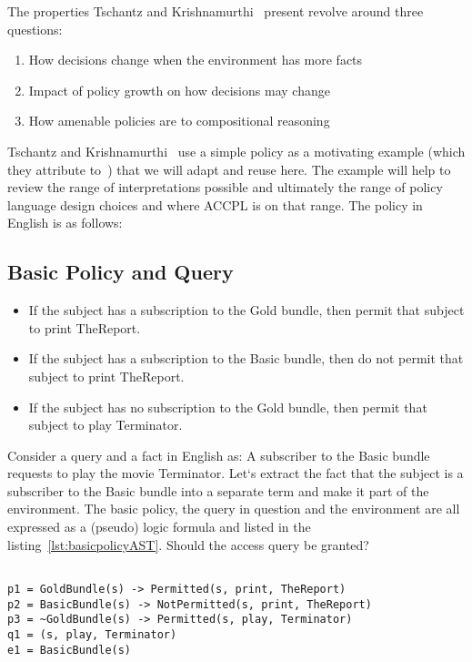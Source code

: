 The properties Tschantz and Krishnamurthi~\cite{Tschantz} present revolve around three questions:

\begin{enumerate}
\item How decisions change when the environment has more facts
\item Impact of policy growth on how decisions may change
\item How amenable policies are to compositional reasoning
\end{enumerate}

Tschantz and Krishnamurthi~\cite{Tschantz} use a simple policy as a motivating example (which they attribute to~\cite{Halpern2008}) that we will adapt and reuse here. The example will help to review the range of interpretations possible and ultimately the range of policy language design choices and where \ac{ACCPL} is on that range.
The policy in English is as follows:
\subsection{Basic Policy and Query}\label{sec:basicpolicyenglish}
\begin{itemize}
\item If the subject has a subscription to the Gold bundle, then permit that subject to print TheReport.

\item If the subject has a subscription to the Basic bundle, then do not permit that subject to print TheReport.

\item If the subject has no subscription to the Gold bundle, then permit that subject to play Terminator.
\end{itemize}

Consider a query and a fact in English as: A subscriber to the Basic bundle requests to play the movie Terminator. Let`s extract the fact that the subject is a subscriber to the Basic bundle into a separate term and make it part of the environment. The basic policy, the query in question and the environment are all expressed as a (pseudo) logic formula and listed in the listing~\ref{lst:basicpolicyAST}. Should the access query be granted?

\lstset{mathescape, language=AST}  
\begin{lstlisting}[frame=single, caption={Basic Policy},label={lst:basicpolicyAST}]

p1 = GoldBundle(s) -> Permitted(s, print, TheReport) 
p2 = BasicBundle(s) -> NotPermitted(s, print, TheReport) 
p3 = ~GoldBundle(s) -> Permitted(s, play, Terminator)
q1 = (s, play, Terminator) 
e1 = BasicBundle(s)
\end{lstlisting}


